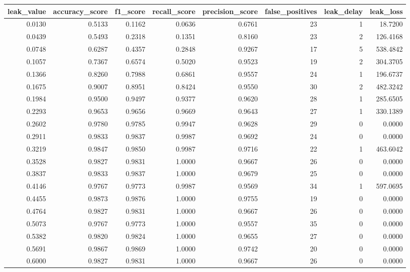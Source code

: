 \begin{tabular}{rrrrrrrr}
\toprule
leak\_value & accuracy\_score & f1\_score & recall\_score & precision\_score & false\_positives & leak\_delay & leak\_loss \\
\midrule
0.0130 & 0.5133 & 0.1162 & 0.0636 & 0.6761 & 23 & 1 & 18.7200 \\
0.0439 & 0.5493 & 0.2318 & 0.1351 & 0.8160 & 23 & 2 & 126.4168 \\
0.0748 & 0.6287 & 0.4357 & 0.2848 & 0.9267 & 17 & 5 & 538.4842 \\
0.1057 & 0.7367 & 0.6574 & 0.5020 & 0.9523 & 19 & 2 & 304.3705 \\
0.1366 & 0.8260 & 0.7988 & 0.6861 & 0.9557 & 24 & 1 & 196.6737 \\
0.1675 & 0.9007 & 0.8951 & 0.8424 & 0.9550 & 30 & 2 & 482.3242 \\
0.1984 & 0.9500 & 0.9497 & 0.9377 & 0.9620 & 28 & 1 & 285.6505 \\
0.2293 & 0.9653 & 0.9656 & 0.9669 & 0.9643 & 27 & 1 & 330.1389 \\
0.2602 & 0.9780 & 0.9785 & 0.9947 & 0.9628 & 29 & 0 & 0.0000 \\
0.2911 & 0.9833 & 0.9837 & 0.9987 & 0.9692 & 24 & 0 & 0.0000 \\
0.3219 & 0.9847 & 0.9850 & 0.9987 & 0.9716 & 22 & 1 & 463.6042 \\
0.3528 & 0.9827 & 0.9831 & 1.0000 & 0.9667 & 26 & 0 & 0.0000 \\
0.3837 & 0.9833 & 0.9837 & 1.0000 & 0.9679 & 25 & 0 & 0.0000 \\
0.4146 & 0.9767 & 0.9773 & 0.9987 & 0.9569 & 34 & 1 & 597.0695 \\
0.4455 & 0.9873 & 0.9876 & 1.0000 & 0.9755 & 19 & 0 & 0.0000 \\
0.4764 & 0.9827 & 0.9831 & 1.0000 & 0.9667 & 26 & 0 & 0.0000 \\
0.5073 & 0.9767 & 0.9773 & 1.0000 & 0.9557 & 35 & 0 & 0.0000 \\
0.5382 & 0.9820 & 0.9824 & 1.0000 & 0.9655 & 27 & 0 & 0.0000 \\
0.5691 & 0.9867 & 0.9869 & 1.0000 & 0.9742 & 20 & 0 & 0.0000 \\
0.6000 & 0.9827 & 0.9831 & 1.0000 & 0.9667 & 26 & 0 & 0.0000 \\
\bottomrule
\end{tabular}

